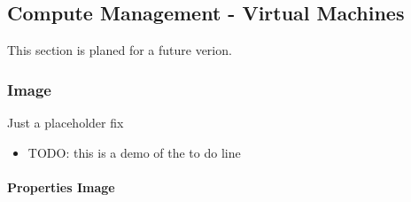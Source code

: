 \documentclass[9pt,]{article}
\providecommand{\tightlist}{%
  \setlength{\itemsep}{0pt}\setlength{\parskip}{0pt}}
\let\oldparagraph\paragraph
\renewcommand{\paragraph}[1]{\oldparagraph{#1}\mbox{}}
\begin{document}
\hypertarget{compute-management---virtual-machines}{%
\subsection{Compute Management - Virtual
Machines}\label{compute-management---virtual-machines}}

This section is planed for a future verion.

\hypertarget{image}{%
\subsubsection{Image}\label{image}}

Just a placeholder fix

\begin{itemize}
\tightlist
\item
  TODO: this is a demo of the to do line
\end{itemize}

\hypertarget{properties-image}{%
\paragraph{Properties Image}\label{properties-image}}
\end{document}
